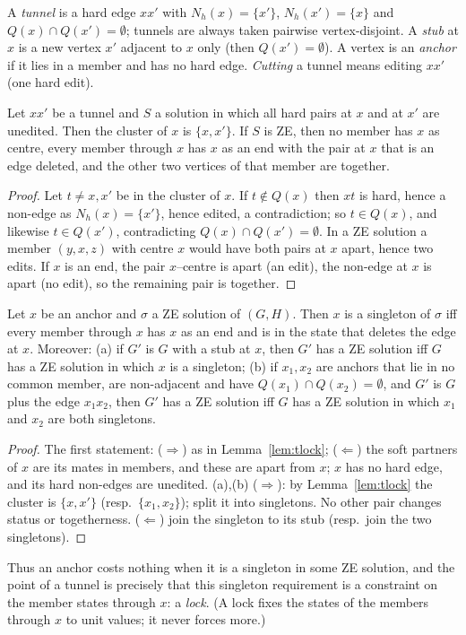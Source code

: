 A \emph{tunnel} is a hard edge $xx'$ with $N_h(x)=\{x'\}$, $N_h(x')=\{x\}$ and $Q(x)\cap Q(x')=\emptyset$; tunnels are always taken pairwise vertex-disjoint. A \emph{stub} at $x$ is a new vertex $x'$ adjacent to $x$ only (then $Q(x')=\emptyset$). A vertex is an \emph{anchor} if it lies in a member and has no hard edge. \emph{Cutting} a tunnel means editing $xx'$ (one hard edit).

\begin{lemma}\label{lem:tlock}
Let $xx'$ be a tunnel and $S$ a solution in which all hard pairs at $x$ and at $x'$ are unedited. Then the cluster of $x$ is $\{x,x'\}$. If $S$ is ZE, then no member has $x$ as centre, every member through $x$ has $x$ as an end with the pair at $x$ that is an edge deleted, and the other two vertices of that member are together.
\end{lemma}
\begin{proof}
Let $t\ne x,x'$ be in the cluster of $x$. If $t\notin Q(x)$ then $xt$ is hard, hence a non-edge as $N_h(x)=\{x'\}$, hence edited, a contradiction; so $t\in Q(x)$, and likewise $t\in Q(x')$, contradicting $Q(x)\cap Q(x')=\emptyset$. In a ZE solution a member $(y,x,z)$ with centre $x$ would have both pairs at $x$ apart, hence two edits. If $x$ is an end, the pair $x$--centre is apart (an edit), the non-edge at $x$ is apart (no edit), so the remaining pair is together.
\end{proof}

\begin{lemma}[Anchors: singleton $=$ forced states; inactive anchors cost nothing]\label{lem:tinactive}
Let $x$ be an anchor and $\sigma$ a ZE solution of $(G,H)$. Then $x$ is a singleton of $\sigma$ iff every member through $x$ has $x$ as an end and is in the state that deletes the edge at $x$. Moreover:
(a) if $G'$ is $G$ with a stub at $x$, then $G'$ has a ZE solution iff $G$ has a ZE solution in which $x$ is a singleton;
(b) if $x_1,x_2$ are anchors that lie in no common member, are non-adjacent and have $Q(x_1)\cap Q(x_2)=\emptyset$, and $G'$ is $G$ plus the edge $x_1x_2$, then $G'$ has a ZE solution iff $G$ has a ZE solution in which $x_1$ and $x_2$ are both singletons.
\end{lemma}
\begin{proof}
The first statement: ($\Rightarrow$) as in Lemma~\ref{lem:tlock}; ($\Leftarrow$) the soft partners of $x$ are its mates in members, and these are apart from $x$; $x$ has no hard edge, and its hard non-edges are unedited. (a),(b) ($\Rightarrow$): by Lemma~\ref{lem:tlock} the cluster is $\{x,x'\}$ (resp.\ $\{x_1,x_2\}$); split it into singletons. No other pair changes status or togetherness. ($\Leftarrow$) join the singleton to its stub (resp.\ join the two singletons).
\end{proof}
Thus an anchor costs nothing when it is a singleton in some ZE solution, and the point of a tunnel is precisely that this singleton requirement is a constraint on the member states through $x$: a \emph{lock}. (A lock fixes the states of the members through $x$ to unit values; it never forces more.)

